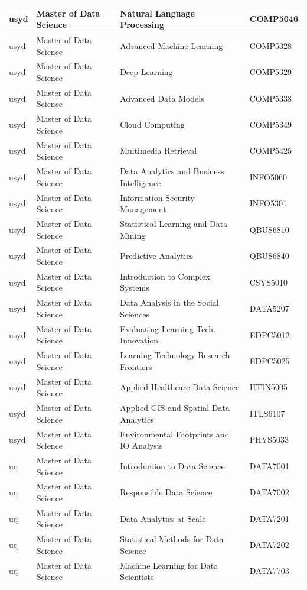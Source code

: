\documentclass[
  letterpaper,
  DIV=11,
  numbers=noendperiod]{scrreport}
\begin{document}
\begin{table}
\begin{tabular}{l|l|l|l}
\hline
usyd & Master of Data Science & Natural Language Processing & COMP5046\\
\hline
usyd & Master of Data Science & Advanced Machine Learning & COMP5328\\
\hline
usyd & Master of Data Science & Deep Learning & COMP5329\\
\hline
usyd & Master of Data Science & Advanced Data Models & COMP5338\\
\hline
usyd & Master of Data Science & Cloud Computing & COMP5349\\
\hline
usyd & Master of Data Science & Multimedia Retrieval & COMP5425\\
\hline
usyd & Master of Data Science & Data Analytics and Business Intelligence & INFO5060\\
\hline
usyd & Master of Data Science & Information Security Management & INFO5301\\
\hline
usyd & Master of Data Science & Statistical Learning and Data Mining & QBUS6810\\
\hline
usyd & Master of Data Science & Predictive Analytics & QBUS6840\\
\hline
usyd & Master of Data Science & Introduction to Complex Systems & CSYS5010\\
\hline
usyd & Master of Data Science & Data Analysis in the Social Sciences & DATA5207\\
\hline
usyd & Master of Data Science & Evaluating Learning Tech. Innovation & EDPC5012\\
\hline
usyd & Master of Data Science & Learning Technology Research Frontiers & EDPC5025\\
\hline
usyd & Master of Data Science & Applied Healthcare Data Science & HTIN5005\\
\hline
usyd & Master of Data Science & Applied GIS and Spatial Data Analytics & ITLS6107\\
\hline
usyd & Master of Data Science & Environmental Footprints and IO Analysis & PHYS5033\\
\hline
uq & Master of Data Science & Introduction to Data Science & DATA7001\\
\hline
uq & Master of Data Science & Responsible Data Science & DATA7002\\
\hline
uq & Master of Data Science & Data Analytics at Scale & DATA7201\\
\hline
uq & Master of Data Science & Statistical Methods for Data Science & DATA7202\\
\hline
uq & Master of Data Science & Machine Learning for Data Scientists & DATA7703\\

\end{tabular}
\end{table}
\end{document}
